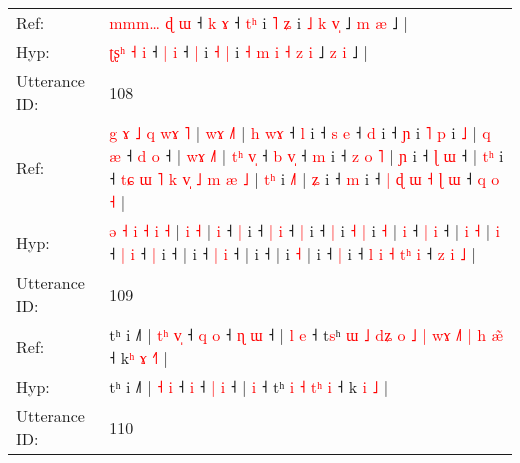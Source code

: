 \documentclass[10pt]{article}
\DeclareRobustCommand{\hl}[1]{{\textcolor{red}{#1}}}
\begin{document}
\begin{longtable}{ll}
Ref: & \hl{m}\hl{m}\hl{m}\hl{…} \hl{ɖ} \hl{ɯ} ˧ \hl{k} \hl{ɤ} ˧ \hl{t}\hl{ʰ} i \hl{˥} \hl{ʑ} i\hl{}\hl{}\hl{}\hl{} \hl{˩} \hl{k} \hl{}\hl{v}\hl{̩} ˩ \hl{m} \hl{æ} ˩ |
 \\
Hyp: & \hl{}\hl{ʈ}\hl{ʂ}\hl{ʰ} \hl{˧} \hl{i} ˧ \hl{|} \hl{i} ˧ \hl{}\hl{|} i \hl{˧} \hl{|} i\hl{ }\hl{˧}\hl{ }\hl{m} \hl{i} \hl{˧} \hl{z}\hl{ }\hl{i} ˩ \hl{z} \hl{i} ˩ |
 \\
\midrule
Utterance ID: & 108 \\
Ref: & \hl{g} \hl{ɤ} \hl{˩} \hl{q} \hl{w}\hl{ɤ} \hl{˥} | \hl{w}\hl{ɤ} \hl{˩}\hl{˥} |\hl{ }\hl{h} \hl{w}\hl{ɤ} ˧ \hl{l} i ˧ \hl{s} \hl{e} ˧ \hl{d} i ˧ \hl{ɲ} i \hl{˥} \hl{p} i \hl{˩} |\hl{ }\hl{q} \hl{æ} ˧ \hl{d} \hl{o} ˧ | \hl{w}\hl{ɤ} \hl{˩}\hl{˥} |\hl{ }\hl{t}\hl{ʰ} \hl{v}\hl{̩} ˧ \hl{b} \hl{v}\hl{̩} ˧ \hl{m} i ˧\hl{ }\hl{z}\hl{ }\hl{o}\hl{ }\hl{˥} |\hl{ }\hl{ɲ} i ˧ \hl{ɭ} \hl{ɯ} ˧ |\hl{ }\hl{t}\hl{ʰ} i ˧\hl{ }\hl{t}\hl{ɕ}\hl{ }\hl{ɯ}\hl{ }\hl{˥}\hl{ }\hl{k}\hl{ }\hl{v}\hl{̩}\hl{ }\hl{˩}\hl{ }\hl{m}\hl{ }\hl{æ}\hl{ }\hl{˩} |\hl{ }\hl{t}\hl{ʰ} i \hl{˩}\hl{˥} |\hl{ }\hl{ʑ} i ˧ \hl{m} i ˧ \hl{|} \hl{ɖ} \hl{ɯ} \hl{˧}\hl{ }\hl{ɭ} \hl{ɯ} ˧ \hl{q} \hl{o} \hl{˧} |
 \\
Hyp: & \hl{ə} \hl{˧} \hl{i} \hl{˧} \hl{}\hl{i} \hl{˧} | \hl{}\hl{i} \hl{}\hl{˧} |\hl{}\hl{} \hl{}\hl{i} ˧ \hl{|} i ˧ \hl{|} \hl{i} ˧ \hl{|} i ˧ \hl{|} i \hl{˧} \hl{|} i \hl{˧} |\hl{}\hl{} \hl{i} ˧ \hl{|} \hl{i} ˧ | \hl{}\hl{i} \hl{}\hl{˧} |\hl{}\hl{}\hl{} \hl{}\hl{i} ˧ \hl{|} \hl{}\hl{i} ˧ \hl{|} i ˧\hl{}\hl{}\hl{}\hl{}\hl{}\hl{} |\hl{}\hl{} i ˧ \hl{|} \hl{i} ˧ |\hl{}\hl{}\hl{} i ˧\hl{}\hl{}\hl{}\hl{}\hl{}\hl{}\hl{}\hl{}\hl{}\hl{}\hl{}\hl{}\hl{}\hl{}\hl{}\hl{}\hl{}\hl{}\hl{}\hl{} |\hl{}\hl{}\hl{} i \hl{}\hl{˧} |\hl{}\hl{} i ˧ \hl{|} i ˧ \hl{l} \hl{i} \hl{˧} \hl{}\hl{t}\hl{ʰ} \hl{i} ˧ \hl{z} \hl{i} \hl{˩} |
 \\
\midrule
Utterance ID: & 109 \\
Ref: & tʰ i ˩˥ | \hl{t}\hl{ʰ} \hl{v}\hl{̩} ˧\hl{ }\hl{q} \hl{o} ˧ \hl{ɳ} \hl{ɯ} ˧ |\hl{ }\hl{l} \hl{e} ˧ t\hl{s}ʰ\hl{ }\hl{ɯ}\hl{ }\hl{˩}\hl{ }\hl{d}\hl{ʑ}\hl{ }\hl{o}\hl{ }\hl{˩}\hl{ }\hl{|} \hl{w}\hl{ɤ} \hl{˩}\hl{˥} \hl{|}\hl{ }\hl{h} \hl{æ}\hl{̃} ˧ k\hl{ʰ} \hl{ɤ} \hl{˧}\hl{˥} |
 \\
Hyp: & tʰ i ˩˥ | \hl{}\hl{˧} \hl{}\hl{i} ˧\hl{}\hl{} \hl{i} ˧ \hl{|} \hl{i} ˧ |\hl{}\hl{} \hl{i} ˧ t\hl{}ʰ\hl{}\hl{}\hl{}\hl{}\hl{}\hl{}\hl{}\hl{}\hl{}\hl{}\hl{}\hl{}\hl{} \hl{}\hl{i} \hl{}\hl{˧} \hl{}\hl{t}\hl{ʰ} \hl{}\hl{i} ˧ k\hl{} \hl{i} \hl{}\hl{˩} |
 \\
\midrule
Utterance ID: & 110 \\

\end{longtable}
\end{document}
